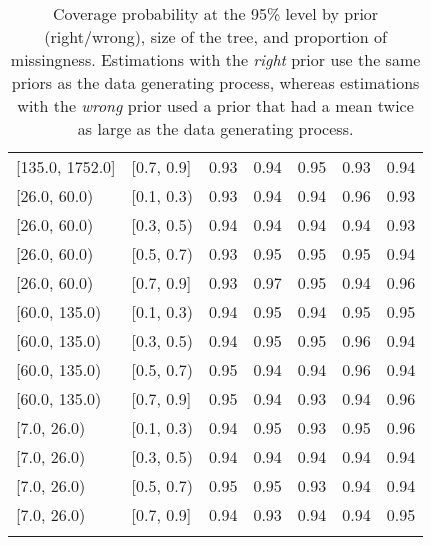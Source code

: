 \begin{table}[ht]
\begin{tabular}{llrrrrr}
  {[135.0, 1752.0]} & {[0.7, 0.9]} & 0.93 & 0.94 & 0.95 & 0.93 & 0.94 \\ 
  {[26.0, 60.0)} & {[0.1, 0.3)} & 0.93 & 0.94 & 0.94 & 0.96 & 0.93 \\ 
  {[26.0, 60.0)} & {[0.3, 0.5)} & 0.94 & 0.94 & 0.94 & 0.94 & 0.93 \\ 
  {[26.0, 60.0)} & {[0.5, 0.7)} & 0.93 & 0.95 & 0.95 & 0.95 & 0.94 \\ 
  {[26.0, 60.0)} & {[0.7, 0.9]} & 0.93 & 0.97 & 0.95 & 0.94 & 0.96 \\ 
  {[60.0, 135.0)} & {[0.1, 0.3)} & 0.94 & 0.95 & 0.94 & 0.95 & 0.95 \\ 
  {[60.0, 135.0)} & {[0.3, 0.5)} & 0.94 & 0.95 & 0.95 & 0.96 & 0.94 \\ 
  {[60.0, 135.0)} & {[0.5, 0.7)} & 0.95 & 0.94 & 0.94 & 0.96 & 0.94 \\ 
  {[60.0, 135.0)} & {[0.7, 0.9]} & 0.95 & 0.94 & 0.93 & 0.94 & 0.96 \\ 
  {[7.0, 26.0)} & {[0.1, 0.3)} & 0.94 & 0.95 & 0.93 & 0.95 & 0.96 \\ 
  {[7.0, 26.0)} & {[0.3, 0.5)} & 0.94 & 0.94 & 0.94 & 0.94 & 0.94 \\ 
  {[7.0, 26.0)} & {[0.5, 0.7)} & 0.95 & 0.95 & 0.93 & 0.94 & 0.94 \\ 
  {[7.0, 26.0)} & {[0.7, 0.9]} & 0.94 & 0.93 & 0.94 & 0.94 & 0.95 \\ 
   \bottomrule
\multicolumn{7}{l}{}\\
\end{tabular}
\caption{Coverage probability at the 95\% level by prior (right/wrong), size of the tree, and proportion of missingness.  Estimations with the \emph{right} prior use the same priors as the data generating process, whereas estimations with the \emph{wrong} prior used a prior that had a mean twice as large as the data generating process.} 
\label{tab:coverage95-method-size-missigness}
\end{table}
